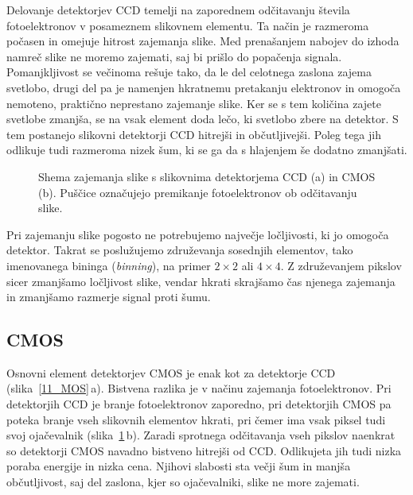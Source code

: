 Delovanje detektorjev CCD temelji na zaporednem odčitavanju števila fotoelektronov v posameznem 
slikovnem elementu. Ta način je razmeroma počasen in omejuje hitrost zajemanja slike. Med 
prenašanjem nabojev do izhoda namreč slike ne moremo zajemati, saj bi prišlo do popačenja signala. 
Pomanjkljivost se večinoma rešuje tako, da le del celotnega zaslona zajema svetlobo, drugi del
pa je namenjen hkratnemu pretakanju elektronov in omogoča nemoteno, praktično neprestano zajemanje slike.
Ker se s tem količina zajete svetlobe zmanjša, se na vsak element doda lečo, ki svetlobo zbere
na detektor. S tem postanejo slikovni detektorji CCD hitrejši in občutljivejši. Poleg
tega jih odlikuje tudi razmeroma nizek šum, ki se ga da s hlajenjem še dodatno 
zmanjšati. 

\begin{figure}[ht]
\centering
\def\svgwidth{100truemm} 

\caption{Shema zajemanja slike s slikovnima detektorjema CCD (a) in  CMOS (b). Puščice označujejo premikanje
fotoelektronov ob odčitavanju slike.}
\label{11_CCD}
\end{figure}

\begin{remark}
Pri zajemanju slike pogosto ne potrebujemo največje ločljivosti, ki jo omogoča detektor. 
Takrat se poslužujemo združevanja sosednjih elementov, tako imenovanega bininga ({\it binning}), 
na primer $2\times2$ ali $4\times4$. Z združevanjem pikslov sicer zmanjšamo ločljivost slike, 
vendar hkrati skrajšamo čas njenega zajemanja in zmanjšamo razmerje signal proti šumu. 
\end{remark}

\subsection*{CMOS}
Osnovni element detektorjev CMOS je enak kot za detektorje CCD (slika~\ref{11_MOS}\,a). 
Bistvena razlika je v načinu zajemanja fotoelektronov. Pri detektorjih CCD je branje 
fotoelektronov zaporedno, pri detektorjih CMOS pa poteka branje vseh slikovnih elementov 
hkrati, pri čemer ima vsak piksel tudi svoj ojačevalnik (slika~\ref{11_CCD}\,b).
Zaradi sprotnega odčitavanja vseh pikslov naenkrat so detektorji CMOS navadno bistveno hitrejši 
od CCD. Odlikujeta jih tudi nizka poraba energije in nizka cena. Njihovi slabosti sta
večji šum in manjša občutljivost, saj del zaslona, kjer so ojačevalniki, slike ne more
zajemati. 

